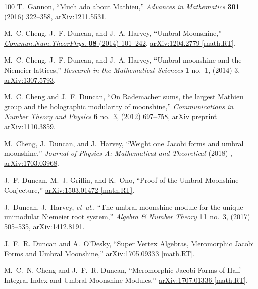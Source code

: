 \begin{thebibliography}{100}
T.~Gannon, ``Much ado about {M}athieu,'' {\em Advances in Mathematics}
  {\bfseries 301} (2016) 322--358,
  \href{http://arxiv.org/abs/arXiv:1211.5531}{{\ttfamily arXiv:1211.5531}}.

M.~C. Cheng, J.~F. Duncan, and J.~A. Harvey, ``{Umbral Moonshine},''
  \href{http://dx.doi.org/10.4310/CNTP.2014.v8.n2.a1}{{\em
  Commun.Num.TheorPhys.} {\bfseries 08} (2014) 101--242},
  \href{http://arxiv.org/abs/1204.2779}{{\ttfamily arXiv:1204.2779 [math.RT]}}.

M.~C. Cheng, J.~F. Duncan, and J.~A. Harvey, ``{Umbral moonshine and the
  Niemeier lattices},'' {\em Research in the Mathematical Sciences} {\bfseries
  1} no.~1, (2014) 3, \href{http://arxiv.org/abs/arXiv:1307.5793}{{\ttfamily
  arXiv:1307.5793}}.

M.~C. Cheng and J.~F. Duncan, ``{On Rademacher sums, the largest Mathieu group
  and the holographic modularity of moonshine},'' {\em Communications in Number
  Theory and Physics} {\bfseries 6} no.~3, (2012) 697--758,
  \href{http://arxiv.org/abs/arXiv preprint arXiv:1110.3859}{{\ttfamily arXiv
  preprint arXiv:1110.3859}}.

M.~Cheng, J.~Duncan, and J.~Harvey, ``{Weight one Jacobi forms and umbral
  moonshine},'' {\em Journal of Physics A: Mathematical and Theoretical} (2018)
  , \href{http://arxiv.org/abs/arXiv:1703.03968}{{\ttfamily arXiv:1703.03968}}.

J.~F. Duncan, M.~J. Griffin, and K.~Ono, ``{Proof of the Umbral Moonshine
  Conjecture},'' \href{http://arxiv.org/abs/1503.01472}{{\ttfamily
  arXiv:1503.01472 [math.RT]}}.

J.~Duncan, J.~Harvey, {\em et~al.}, ``{The umbral moonshine module for the
  unique unimodular Niemeier root system},'' {\em Algebra \& Number Theory}
  {\bfseries 11} no.~3, (2017) 505--535,
  \href{http://arxiv.org/abs/arXiv:1412.8191}{{\ttfamily arXiv:1412.8191}}.

J.~F.~R. Duncan and A.~O'Desky, ``{Super Vertex Algebras, Meromorphic Jacobi
  Forms and Umbral Moonshine},''
\href{http://arxiv.org/abs/1705.09333}{{\ttfamily arXiv:1705.09333 [math.RT]}}.

M.~C.~N. Cheng and J.~F.~R. Duncan, ``{Meromorphic Jacobi Forms of
  Half-Integral Index and Umbral Moonshine Modules},''
\href{http://arxiv.org/abs/1707.01336}{{\ttfamily arXiv:1707.01336 [math.RT]}}.


\end{thebibliography}
